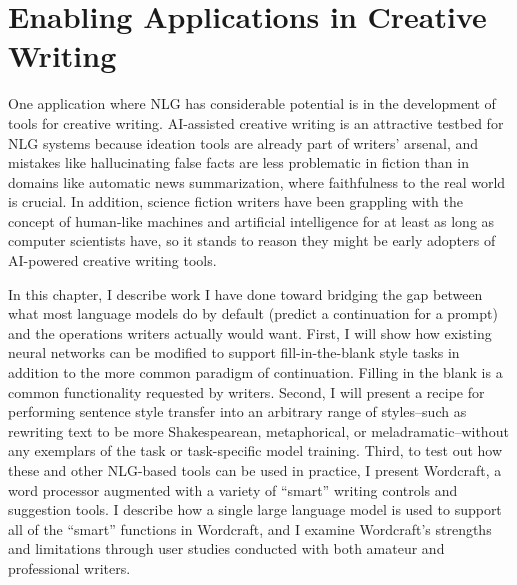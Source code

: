 \chapter{Enabling Applications in Creative Writing}
\label{chap:creativity}
One application where NLG has considerable potential is in the development of tools for creative writing.
AI-assisted creative writing is an attractive testbed for NLG systems because ideation tools are already part of writers' arsenal, and mistakes like hallucinating false facts are less problematic in fiction than in domains like automatic news summarization, where faithfulness to the real world is crucial.
In addition, science fiction writers have been grappling with the concept of human-like machines and artificial intelligence for at least as long as computer scientists have, so it stands to reason they might be early adopters of AI-powered creative writing tools.

In this chapter, I describe work I have done toward bridging the gap between what most language models do by default (predict a continuation for a prompt) and the operations writers actually would want.
First, I will show how existing neural networks can be modified to support fill-in-the-blank style tasks in addition to the more common paradigm of continuation.
Filling in the blank is a common functionality requested by writers.
Second, I will present a recipe for performing sentence style transfer into an arbitrary range of styles--such as rewriting text to be more Shakespearean, metaphorical, or meladramatic--without any exemplars of the task or task-specific model training.
Third, to test out how these and other NLG-based tools can be used in practice, I present Wordcraft, a word processor augmented with a variety of ``smart'' writing controls and suggestion tools.
I describe how a single large language model is used to support all of the ``smart'' functions in Wordcraft, and I examine Wordcraft's strengths and limitations through user studies conducted with both amateur and professional writers.



